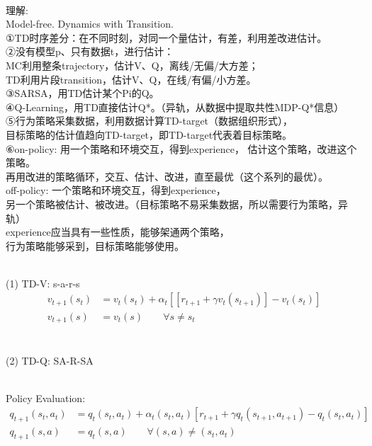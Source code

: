 \documentclass{article}
\begin{document}
~ \\[3pt]
\begin{CJK}{UTF8}{gbsn}
    理解: \\[5pt]
    Model-free. Dynamics with Transition. \\[5pt]
    ①TD时序差分：在不同时刻，对同一个量估计，有差，利用差改进估计。 \\[5pt]
    ②没有模型p、只有数据t，进行估计： \\[5pt]
    MC利用整条trajectory，估计V、Q，离线/无偏/大方差； \\[5pt]
    TD利用片段transition，估计V、Q，在线/有偏/小方差。 \\[5pt]
    ③SARSA，用TD估计某个Pi的Q。 \\[5pt]
    ④Q-Learning，用TD直接估计Q*。（异轨，从数据中提取共性MDP-Q*信息） \\[5pt]
    ⑤行为策略采集数据，利用数据计算TD-target（数据组织形式）， \\[5pt]
    目标策略的估计值趋向TD-target，即TD-target代表着目标策略。 \\[5pt]
    ⑥on-policy: 用一个策略和环境交互，得到experience， 
    估计这个策略，改进这个策略。 \\[5pt]
    再用改进的策略循环，交互、估计、改进，直至最优（这个系列的最优）。 \\[5pt]
    off-policy: 一个策略和环境交互，得到experience， \\[5pt]
    另一个策略被估计、被改进。（目标策略不易采集数据，所以需要行为策略，异轨） \\[5pt]
    experience应当具有一些性质，能够架通两个策略， \\[5pt]
    行为策略能够采到，目标策略能够使用。 \\[5pt]
\end{CJK}


~ \\[3pt]
(1) TD-V: \qquad s-a-r-s 
\begin{align*}
    v_{t+1} (s_{t}) &= v_{t} (s_{t}) + \alpha_{t} 
        [ [r_{t+1} + \gamma v_{t} (s_{t+1})] - v_{t} (s_{t}) ] \\[3pt]
    v_{t+1} (s)     &= v_{t} (s) 
    \qquad \forall s \neq s_{t} \\[3pt]
\end{align*}

\newpage

~ \\[3pt]
(2) TD-Q: \qquad SA-R-SA 

~ \\[3pt]
Policy Evaluation: 
\begin{align*}
    q_{t+1} (s_{t}, a_{t}) 
        &= q_{t} (s_{t}, a_{t}) + \alpha_{t} (s_{t}, a_{t}) 
        [ r_{t+1} + \gamma q_{t} (s_{t+1}, a_{t+1}) 
        - q_{t} (s_{t}, a_{t}) ] \\[3pt]
    q_{t+1} (s, a) &= q_{t} (s, a) 
    \qquad \forall (s, a) \neq (s_{t}, a_{t}) 
\end{align*}
\end{document}
